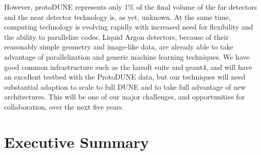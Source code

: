 However, protoDUNE represents only 1\% of the final volume of the far detectors and the near detector technology is, as yet, unknown.  At the same time, computing technology is evolving rapidly with increased need for flexibility and the ability to parallelize codes.  Liquid Argon detectors, because of their reasonably simple geometry and image-like data, are already able to take advantage of parallelization and generic machine learning techniques.  We have good common infrastructure such as the larsoft suite and geant4, and will have an excellent testbed with the ProtoDUNE data,  but our techniques will need substantial adaption to scale to full DUNE and to take full advantage of new architectures.  This will be one of our major challenges, and opportunities for collaboration,  over the next five years.

\section{Executive Summary}

